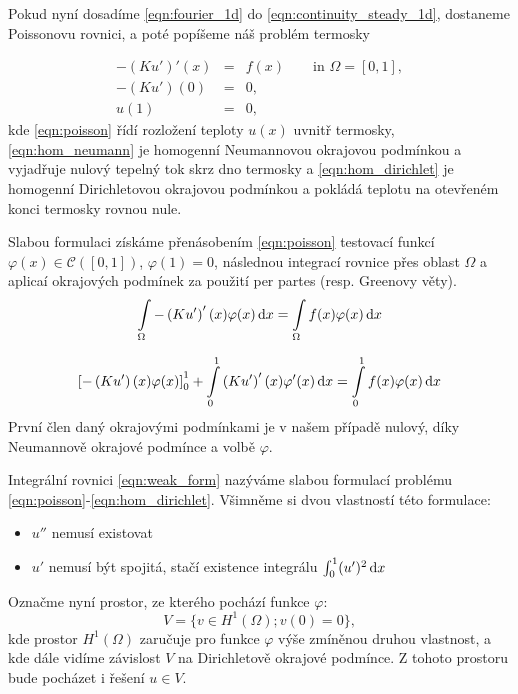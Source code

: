Pokud nyní dosadíme \eqref{eqn:fourier_1d} do \eqref{eqn:continuity_steady_1d}, dostaneme Poissonovu rovnici,
a poté popíšeme náš problém termosky

\begin{eqnarray}
-(Ku')'(x) &=& f(x) \qquad \textrm{in } \Omega = [0,1], \label{eqn:poisson}\\
-(Ku')(0) &=& 0, \label{eqn:hom_neumann}\\
u(1) &=& 0, \label{eqn:hom_dirichlet}
\end{eqnarray}
kde \eqref{eqn:poisson} řídí rozložení teploty $u(x)$ uvnitř termosky,
\eqref{eqn:hom_neumann} je homogenní Neumannovou okrajovou podmínkou a vyjadřuje nulový tepelný tok skrz dno termosky
a \eqref{eqn:hom_dirichlet} je homogenní Dirichletovou okrajovou podmínkou a pokládá teplotu na otevřeném konci termosky rovnou nule.


Slabou formulaci získáme přenásobením \eqref{eqn:poisson} testovací funkcí $\varphi(x)\in\mathcal{C}([0,1])$, $\varphi(1)=0$, 
následnou integrací rovnice přes oblast $\Omega$ a aplicaí okrajových podmínek za použití per partes (resp. Greenovy věty).
\[
  \int\limits_{\Omega} -\left( Ku'\right)'(x) \varphi(x) \,{\rm d} x = \int\limits_{\Omega} f(x) \varphi(x) \,{\rm d} x
\]

\begin{equation}
\left[-\left( Ku'\right)(x)\varphi(x)\right]_0^1 + \int\limits_0^1 \left( Ku'\right)'(x) \varphi'(x) \,{\rm d} x
    = \int\limits_0^1 f(x) \varphi(x) \,{\rm d} x\label{eqn:weak_form}
\end{equation}
První člen daný okrajovými podmínkami je v našem případě nulový, díky Neumannově okrajové podmínce a volbě $\varphi$.

Integrální rovnici \eqref{eqn:weak_form} nazýváme slabou formulací problému \eqref{eqn:poisson}-\eqref{eqn:hom_dirichlet}.
Všimněme si dvou vlastností této formulace:
\begin{itemize}
  \item $u''$ nemusí existovat
  \item $u'$ nemusí být spojitá, stačí existence integrálu $\int_0^1(u')^2 \,{\rm d} x$
\end{itemize}

Označme nyní prostor, ze kterého pochází funkce $\varphi$:
\begin{equation}
  V = \{v\in H^1(\Omega); v(0) = 0\},
\end{equation}
kde prostor $H^1(\Omega)$ zaručuje pro funkce $\varphi$ výše zmíněnou druhou vlastnost,
a kde dále vidíme závislost $V$ na Dirichletově okrajové podmínce.
Z tohoto prostoru bude pocházet i řešení $u\in V$.

